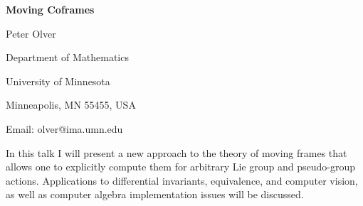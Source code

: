 

\centerline{\bf Moving Coframes}

\vskip 0.3cm

\centerline{Peter Olver}
\centerline{Department of Mathematics}
\centerline{University of Minnesota}
\centerline{Minneapolis, MN 55455, USA}
\centerline{Email: olver@ima.umn.edu}

\vskip 0.3cm

In this talk I will present a new approach to the theory of
moving frames that allows one to explicitly compute them
for arbitrary Lie group and pseudo-group actions.
Applications to differential invariants, equivalence, and
computer vision, as well as computer algebra implementation
issues will be discussed.


